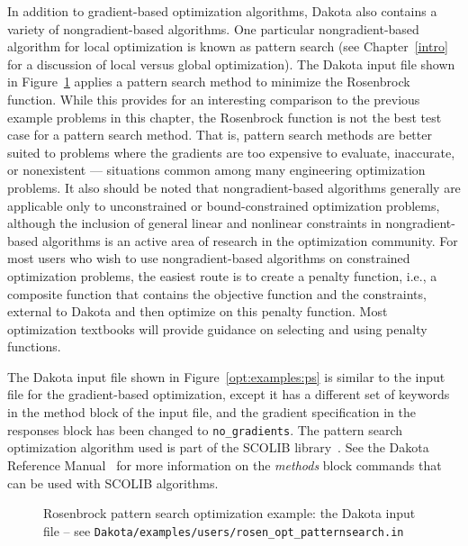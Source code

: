 In addition to gradient-based optimization algorithms, Dakota also
contains a variety of nongradient-based algorithms. One particular
nongradient-based algorithm for local optimization is known as pattern
search (see Chapter~\ref{intro} for a discussion of local
versus global optimization). The Dakota input file shown in
Figure~\ref{opt:examples:psfig} applies a pattern
search method to minimize the Rosenbrock function. While this
provides for an interesting comparison to the previous example
problems in this chapter, the Rosenbrock function is not the best test
case for a pattern search method. That is, pattern search methods are
better suited to problems where the gradients are too expensive to
evaluate, inaccurate, or nonexistent --- situations common among many
engineering optimization problems. It also should be noted that
nongradient-based algorithms generally are applicable only to
unconstrained or bound-constrained optimization problems, although the
inclusion of general linear and nonlinear constraints in
nongradient-based algorithms is an active area of research in the
optimization community. For most users who wish to use
nongradient-based algorithms on constrained optimization problems, the
easiest route is to create a penalty function, i.e., a composite
function that contains the objective function and the constraints,
external to Dakota and then optimize on this penalty function. Most
optimization textbooks will provide guidance on selecting and using
penalty functions.

The Dakota input file shown in Figure~\ref{opt:examples:ps} is similar
to the input file for the gradient-based optimization, except it has a
different set of keywords in the method block of the input file, and
the gradient specification in the responses block has been changed to
\texttt{no\_gradients}. The pattern search optimization algorithm used
is part of the SCOLIB library~\cite{Har06}. See the Dakota Reference
Manual~\cite{RefMan} for more information on the \emph{methods} block
commands that can be used with SCOLIB algorithms.

\begin{figure}[ht!]
  \centering
  \begin{bigbox}
    \begin{small}
    \end{small}
  \end{bigbox}
  \caption{Rosenbrock pattern search optimization example: the Dakota input file --
see \texttt{Dakota/examples/users/rosen\_opt\_patternsearch.in} }
  \label{opt:examples:psfig}
\end{figure}

